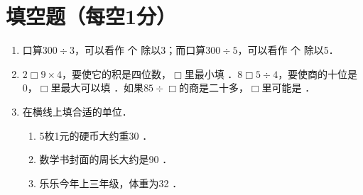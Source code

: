 \documentclass[12pt,twoside,space]{ctexart}
\begin{document}
\juemi %

  \section{填空题（每空1分）}
    \begin{enumerate}[itemsep=-0.2em,topsep=0pt]
      \item 口算$300\div 3$，可以看作 \underline{\hspace{2em}} 个 \underline{\hspace{2em}} 除以3；而口算$300\div 5$，可以看作 \underline{\hspace{2em}} 个 \underline{\hspace{2em}} 除以5．

        \item $2\Box 9\times 4$，要使它的积是四位数，$\Box$里最小填 \underline{\hspace{2em}}．$8\Box 5\div 4$，要使商的十位是0，$\Box$里最大可以填 \underline{\hspace{2em}}．如果$85\div \Box$的商是二十多，$\Box$里可能是 \underline{\hspace{2em}}．

        \item 在横线上填合适的单位．
          \begin{enumerate}[align=left,labelsep=-0.6em,leftmargin=1.2em,noitemsep,topsep=0pt,label={(\arabic*)}]
            \item 5枚1元的硬币大约重30 \underline{\hspace{2em}}．
            \item 数学书封面的周长大约是90 \underline{\hspace{2em}} ．
            \item 乐乐今年上三年级，体重为32 \underline{\hspace{2em}}．
          \end{enumerate}
    \end{enumerate}
\end{document}

